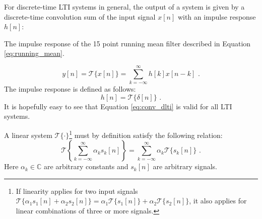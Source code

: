 For discrete-time LTI systems in general, the output of a system is given by a discrete-time convolution sum of the input signal $x[n]$ with an impulse response $h[n]$:

\begin{marginfigure}
  \begin{center}
  \end{center}
  \caption{The impulse response of the 15 point running mean filter described in Equation \ref{eq:running_mean}.}
\end{marginfigure}

\begin{equation}
  \boxed{
    y[n] = \mathcal{T}\{x[n]\}=\sum_{k=-\infty}^{\infty} h[k] x[n-k]\,\,.
  }
  \label{eq:conv_dlti}
\end{equation}
The impulse response is defined as follows:
\begin{equation}
  \boxed{
    h[n] = \mathcal{T}\{\delta[n]\}\,\,.
  \label{eq:conv_ireq}    
    }
\end{equation}
It is hopefully easy to see that Equation \ref{eq:conv_dlti} is valid for all LTI systems. %

A linear system $\mathcal{T}\{\cdot\}$\footnote{If linearity applies for two input signals $\mathcal{T}\{\alpha_1 s_1[n] + \alpha_2 s_2[n]\} = \alpha_1 \mathcal{T}\{s_1[n]\}+\alpha_2 \mathcal{T}\{s_2[n]\}$, it also applies for linear combinations of three or more signals.} must by definition satisfy the following relation:
\begin{equation}
  \mathcal{T}\left\{\sum_{k=-\infty}^{\infty} \alpha_k s_k[n]\right\} = \sum_{k=-\infty}^{\infty} \alpha_k \mathcal{T}\{s_k[n]\}\,\,.
  \label{eq:linearity_gen}
\end{equation}
Here $\alpha_k \in \mathbb{C}$ are arbitrary constants and $s_k[n]$ are arbitrary signals.

